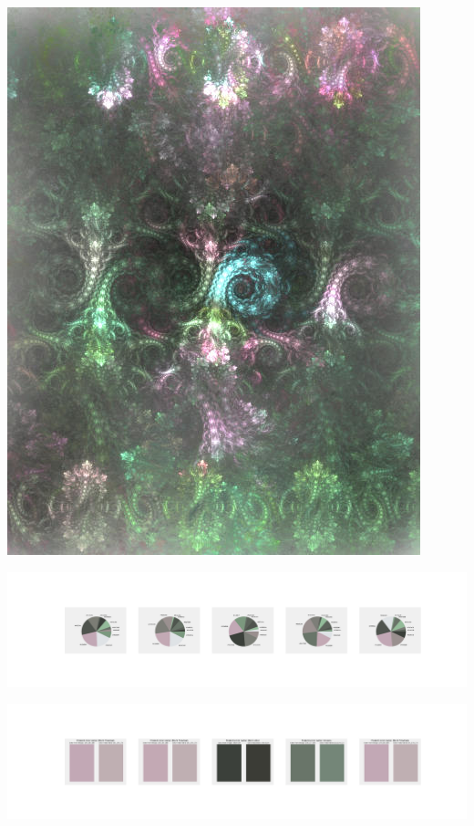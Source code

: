 \documentclass[11pt]{article}
\begin{document}
\begin{landscape}
    \begin{center}
    \includegraphics[width=\textwidth]{./nbimg/file (25).jpg}
    \end{center}

    \begin{center}
    \includegraphics[width=250mm]{./nbimg/pie-167.jpg}
    \end{center}

    \begin{center}
    \includegraphics[width=250mm]{./nbimg/peak-167.jpg}
    \end{center}
    


\end{landscape}
\end{document}

